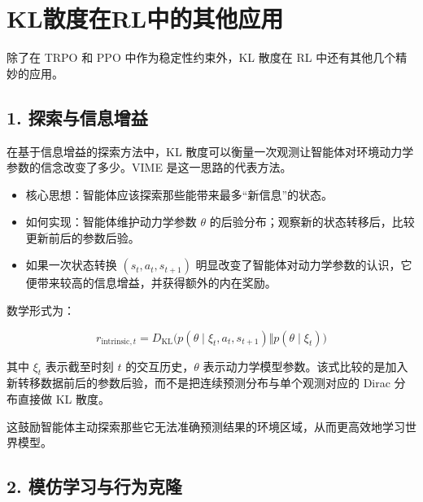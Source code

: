 \setcounter{section}{3}

\hypertarget{klux6563ux5ea6ux5728rlux4e2dux7684ux5176ux4ed6ux5e94ux7528}{%
\section{KL散度在RL中的其他应用}\label{klux6563ux5ea6ux5728rlux4e2dux7684ux5176ux4ed6ux5e94ux7528}}

除了在 TRPO 和 PPO 中作为稳定性约束外，KL 散度在 RL 中还有其他几个精妙的应用。

\hypertarget{ux63a2ux7d22ux4e0eux4fe1ux606fux589eux76ca}{%
\subsection{1. 探索与信息增益}\label{ux63a2ux7d22ux4e0eux4fe1ux606fux589eux76ca}}

在基于信息增益的探索方法中，KL 散度可以衡量一次观测让智能体对环境动力学参数的信念改变了多少。VIME 是这一思路的代表方法。

\begin{itemize}
\tightlist
\item
  核心思想：智能体应该探索那些能带来最多``新信息''的状态。
\item
  如何实现：智能体维护动力学参数 \(\theta\) 的后验分布；观察新的状态转移后，比较更新前后的参数后验。
\item
  如果一次状态转换 \((s_t,a_t,s_{t+1})\) 明显改变了智能体对动力学参数的认识，它便带来较高的信息增益，并获得额外的内在奖励。
\end{itemize}

数学形式为：

\[
r_{\mathrm{intrinsic},t}
=
D_{\mathrm{KL}}\bigl(
p(\theta\mid \xi_t,a_t,s_{t+1})
\Vert
p(\theta\mid \xi_t)
\bigr)
\]

其中 \(\xi_t\) 表示截至时刻 \(t\) 的交互历史，\(\theta\) 表示动力学模型参数。该式比较的是加入新转移数据前后的参数后验，而不是把连续预测分布与单个观测对应的 Dirac 分布直接做 KL 散度。

这鼓励智能体主动探索那些它无法准确预测结果的环境区域，从而更高效地学习世界模型。

\hypertarget{ux6a21ux4effux5b66ux4e60ux4e0eux884cux4e3aux514bux9686}{%
\subsection{2. 模仿学习与行为克隆}\label{ux6a21ux4effux5b66ux4e60ux4e0eux884cux4e3aux514bux9686}}

